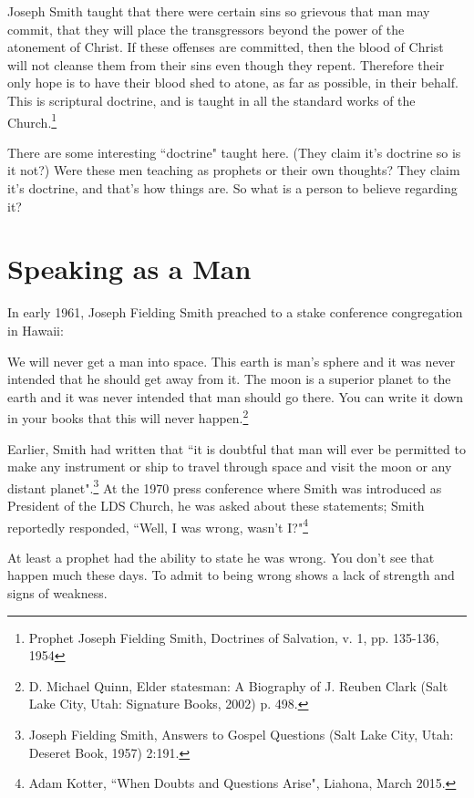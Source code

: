 \begin{displayquote}
Joseph Smith taught that there were certain sins so grievous that man may commit, 
that they will place the transgressors beyond the power of the atonement of Christ. 
If these offenses are committed, then the blood of Christ will not cleanse them 
from their sins even though they repent. Therefore their only hope is to have 
their blood shed to atone, as far as possible, in their behalf. This is scriptural 
doctrine, and is taught in all the standard works of the Church.\footnote{
Prophet Joseph Fielding Smith, Doctrines of Salvation, v. 1, pp. 135-136, 1954
}
\end{displayquote}

There are some interesting ``doctrine" taught here. (They claim it's doctrine so
is it not?) Were these men teaching as prophets or their own thoughts? They claim
it's doctrine, and that's how things are. So what is a person to believe regarding
it?

\section{Speaking as a Man}

In early 1961, Joseph Fielding Smith preached to a stake conference congregation in 
Hawaii:

\begin{displayquote}
We will never get a man into space. This earth is man's sphere and it was never 
intended that he should get away from it. The moon is a superior planet to the 
earth and it was never intended that man should go there. You can write it down in 
your books that this will never happen.\footnote{D. Michael Quinn, Elder statesman: 
A Biography of J. Reuben Clark (Salt Lake City, Utah: Signature Books, 2002) p. 498.}

Earlier, Smith had written that ``it is doubtful that man will ever be permitted 
to make any instrument or ship to travel through space and visit the moon or any 
distant planet".\footnote{Joseph Fielding Smith, Answers to Gospel Questions (Salt 
Lake City, Utah: Deseret Book, 1957) 2:191.} At the 1970 press conference where Smith 
was introduced as President of the LDS Church, he was asked about these statements; 
Smith reportedly responded, ``Well, I was wrong, wasn't I?"\footnote{
Adam Kotter, ``When Doubts and Questions Arise", Liahona, March 2015.
}
\end{displayquote}

At least a prophet had the ability to state he was wrong. You don't see that happen
much these days. To admit to being wrong shows a lack of strength and signs of
weakness.

